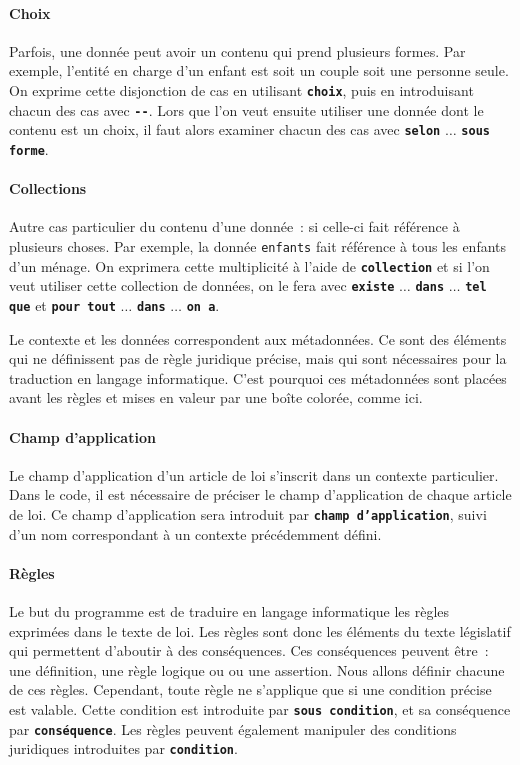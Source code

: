 \documentclass[12pt, french]{article}
\newcommand{\kw}[1]{\textbf{\textcolor{OliveGreen}{#1}}}
\newcommand{\inlinekw}[1]{\kw{\texttt{#1}}}
\newenvironment{metadata}{
  \begin{tcolorbox}[colframe=OliveGreen, title=\textcolor{black}{\texttt{Métadonnées}}, before skip=1em, after skip=1em]
}{
\end{tcolorbox}
}
\begin{document}
\paragraph{Choix} Parfois, une donnée peut avoir un contenu qui prend plusieurs formes. Par exemple, l’entité en charge d’un enfant est soit un couple soit une personne seule. On exprime cette disjonction de cas en utilisant \inlinekw{choix}, puis en introduisant chacun des cas avec \inlinekw{-}\inlinekw{-}. Lors que l’on veut ensuite utiliser une donnée dont le contenu est un choix, il faut alors examiner chacun des cas avec \inlinekw{selon} $\ldots$ \inlinekw{sous forme}.

\paragraph{Collections} Autre cas particulier du contenu d’une donnée : si celle-ci fait référence à plusieurs choses. Par exemple, la donnée \texttt{enfants} fait référence à tous les enfants d’un ménage. On exprimera cette multiplicité à l’aide de \inlinekw{collection} et si l’on veut utiliser cette collection de données, on le fera avec \inlinekw{existe} $\ldots$ \inlinekw{dans} $\ldots$ \inlinekw{tel que} et \inlinekw{pour tout} $\ldots$ \inlinekw{dans} $\ldots$ \inlinekw{on a}.

\begin{metadata}
  Le contexte et les données correspondent aux métadonnées. Ce sont des éléments qui ne définissent pas de règle juridique précise, mais qui sont nécessaires pour la traduction en langage informatique. C’est pourquoi ces métadonnées sont placées avant les règles et mises en valeur par une boîte colorée, comme ici.
\end{metadata}


\paragraph{Champ d’application} Le champ d’application d’un article de loi s’inscrit dans un contexte particulier. Dans le code, il est nécessaire de préciser le champ d’application de chaque article de loi. Ce champ d’application sera introduit par \inlinekw{champ d’application}, suivi d’un nom correspondant à un contexte précédemment défini.

\paragraph{Règles} Le but du programme est de traduire en langage informatique les règles exprimées dans le texte de loi. Les règles sont donc les éléments du texte législatif qui permettent d’aboutir à des conséquences. Ces conséquences peuvent être : une définition, une règle logique ou  ou une assertion. Nous allons définir chacune de ces règles. Cependant, toute règle ne s’applique que si une condition précise est valable. Cette condition est introduite par \inlinekw{sous condition}, et sa conséquence par \inlinekw{conséquence}. Les règles peuvent également manipuler des conditions juridiques introduites par \inlinekw{condition}.
\end{document}

